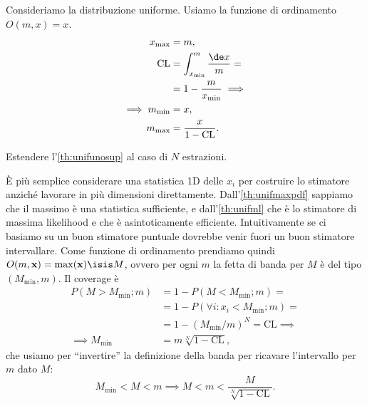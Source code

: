 \begin{example}
	\label{th:unifunosup}
	Consideriamo la distribuzione uniforme.
	Usiamo la funzione di ordinamento $O(m,x)=x$.
	\begin{align*}
		x_\mathrm{max}
		&= m, \\
		\mathrm{CL}
		&= \int_{x_\mathrm{min}}^m \frac{\de x}{m} = \\
		&= 1 - \frac m{x_\mathrm{min}} \implies \\
		\implies m_\mathrm{min}
		&= x, \\
		m_\mathrm{max}
		&= \frac x{1-\mathrm{CL}}.
	\end{align*}
\end{example}

\begin{exercise}
	\label{th:unifsup}
	Estendere l'\autoref{th:unifunosup} al caso di $N$ estrazioni.
\end{exercise}

\begin{solution}
    È più semplice considerare una statistica 1D delle $x_i$ per costruire lo
    stimatore anziché lavorare in più dimensioni direttamente.
    Dall'\autoref{th:unifmaxpdf} sappiamo che il massimo è una statistica
    sufficiente, e dall'\autoref{th:unifml} che è lo stimatore di massima
    likelihood e che è asintoticamente efficiente. Intuitivamente se ci basiamo
    su un buon stimatore puntuale dovrebbe venir fuori un buon stimatore
    intervallare.
    Come funzione di ordinamento prendiamo quindi $O(m, \mathbf x) =
    \max(\mathbf x) \isis M$, ovvero per ogni $m$ la fetta di banda per
    $M$ è del tipo $(M_\text{min}, m)$. Il coverage è
    \begin{align*}
        P(M > M_\text{min};m)
        &= 1 - P(M < M_\text{min};m) = \\
        &= 1 - P(\forall i:x_i < M_\text{min};m) = \\
        &= 1 - (M_\text{min}/m)^N = \mathrm{CL} \implies \\
        \implies M_\text{min} &= m\sqrt[N]{1 - \mathrm{CL}},
    \end{align*}
    che usiamo per ``invertire'' la definizione della banda per ricavare
    l'intervallo per $m$ dato $M$:
    \begin{equation*}
        M_\text{min} < M < m
        \implies M < m < \frac{M}{\sqrt[N]{1-\mathrm{CL}}}.
    \end{equation*}
\end{solution}

